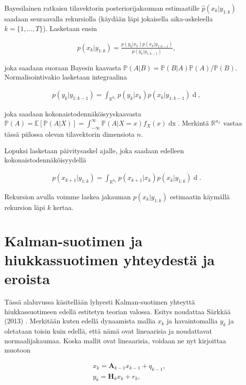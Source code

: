 \documentclass[
  12pt,
  a4paper, twoside]{book}
\begin{document}
Bayesilainen ratkaisu tilavektorin posteriorijakauman estimaatille \(\hat{p}(x_k|y_{1:k})\) saadaan seuraavalla rekursiolla (käydään läpi jokaisella aika-askeleella \(k=\{1,\ldots,T\}\)). Lasketaan ensin

\begin{align}\label{bayes-paivitys}
p(x_k|y_{1:k}) = \frac{p(y_k|x_k)p(x_k|y_{1:k-1})}{p(y_k|y_{1:k-1})},
\end{align}

\noindent joka saadaan suoraan Bayesin kaavasta \(\mathbb{P}(A|B)=\mathbb{P}(B|A)\mathbb{P}(A)/\mathbb{P}(B)\). Normalisointivakio lasketaan integraalina

\begin{align}\label{bayes-normalisointi}
p(y_k|y_{1:k-1})=\int_{\mathbb{R}^{n_x}}p(y_k|x_k)p(x_k|y_{1:k-1})\mathop{dx_k},
\end{align}

\noindent joka saadaan kokonaistodennäköisyyskaavasta \(\mathbb{P}(A)=\mathbb{E}[\mathbb{P}(A|X)]=\int_{-\infty}^{\infty}\mathbb{P}(A|X=x)f_X(x)\mathop{dx}\). Merkintä \(\mathbb{R}^{n_x}\) vastaa tässä piilossa olevan tilavektorin dimensiota \(n\).

Lopuksi lasketaan päivitysaskel ajalle, joka saadaan edelleen kokonaistodennäköisyydellä

\begin{align}\label{bayes-aikapaivitys}
p(x_{k+1}|y_{1:k})=\int_{\mathbb{R}^{n_x}}p(x_{k+1}|x_k)p(x_k|y_{1:k})\mathop{dx_k}.
\end{align}

\noindent Rekursion avulla voimme laskea jakauman \(p(x_k|y_{1:k})\) estimaatin käymällä rekursion läpi \(k\) kertaa.

\section{Kalman-suotimen ja hiukkassuotimen yhteydestä ja eroista} \label{kf-yhteydet-erot}

Tässä alaluvussa käsitellään lyhyesti Kalman-suotimen yhteyttä hiukkassuotimeen edellä estitetyn teorian valossa. Esitys noudattaa Särkkää (2013) \citep{sarkka-2013}. Merkitään kuten edellä dynaamista mallia \(x_k\) ja havaintomallia \(y_k\) ja oletataan toisin kuin edellä, että nämä ovat lineaarisia ja noudattavat normaalijakaumaa. Koska mallit ovat lineaarisia, voidaan ne nyt kirjoittaa muotoon

\begin{align}
&\label{kalman-malli1}x_k=\mathbf{A}_{k-1}x_{k-1}+q_{k-1},\\
&\label{kalman-malli2}y_k=\mathbf{H}_k x_k + r_k,
\end{align}
\end{document}
